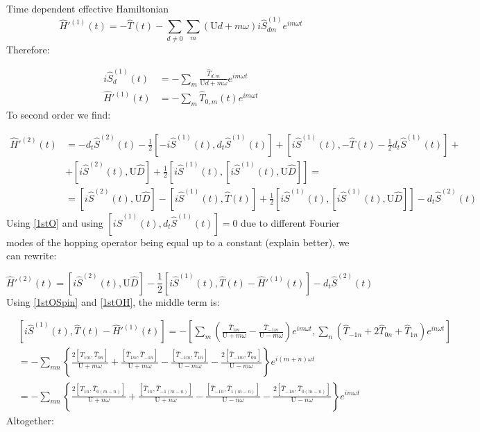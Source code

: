 \begin{section}{Time dependent effective Hamiltonian}
\begin{equation}
\hat{H}'^{(1)}(t)=-\hat{T}(t)-\sum_{d\neq 0}\sum_m (\text{U}d+m\omega) i\hat{S}^{(1)}_{dm} e^{im\omega t}
\end{equation}
Therefore:

\begin{align}
i\hat{S}^{(1)}_d(t) &= -\sum_m \frac{\hat{T}_{d,m}}{\text{U}d+m\omega}e^{im\omega t} \label{1stOSpin}\\
\hat{H}'^{(1)}(t) &= -\sum_m \hat{T}_{0,m}(t)e^{im\omega t} \label{1stOH}
\end{align}
To second order we find:

\begin{align}
\hat{H}'^{(2)}(t) &= - d_t\hat{S}^{(2)}(t) - \frac{1}{2}\left[-i\hat{S}^{(1)}(t), d_t\hat{S}^{(1)}(t) \right] + \left[i\hat{S}^{(1)}(t), -\hat{T}(t)-\frac{1}{2}d_t\hat{S}^{(1)}(t) \right] +\nonumber \\
&+ \left[i\hat{S}^{(2)}(t), \text{U}\hat{D} \right] + \frac{1}{2} \left[i\hat{S}^{(1)}(t), \left[i\hat{S}^{(1)}(t), \text{U}\hat{D} \right] \right] = \nonumber \\
&= \left[i\hat{S}^{(2)}(t), \text{U} \hat{D} \right] - \left[ i\hat{S}^{(1)}(t), \hat{T}(t) \right] + \frac{1}{2}\left[ i\hat{S}^{(1)}(t), \left[ i\hat{S}^{(1)}(t), \text{U}\hat{D} \right] \right] - d_t\hat{S}^{(2)}(t)
\end{align}
Using \ref{1stO} and using $\left[ i\hat{S}^{(1)}(t), d_t\hat{S}^{(1)}(t)\right] = 0$ due to different Fourier modes of the hopping operator being equal up to a constant (explain better), we can rewrite:

\begin{equation}
\hat{H}'^{(2)}(t) = \left[i\hat{S}^{(2)}(t), \text{U} \hat{D} \right] - \frac{1}{2}\left[ i\hat{S}^{(1)}(t), \hat{T}(t) - \hat{H}'^{(1)}(t)\right] - d_t\hat{S}^{(2)}(t)
\end{equation}
Using \ref{1stOSpin} and \ref{1stOH}, the middle term is:

\begin{align*}
&\left[ i\hat{S}^{(1)}(t), \hat{T}(t) - \hat{H}'^{(1)}(t)\right] = -\left[\sum_m \left( \frac{\hat{T}_{1m}}{\text{U}+m\omega} - \frac{\hat{T}_{-1m}}{\text{U}-m\omega} \right)e^{im \omega t}, \sum_n \left( \hat{T}_{-1n} + 2\hat{T}_{0n} + \hat{T}_{1n} \right) e^{in\omega t} \right] \\
&= -\sum_{mn} \left\{ \frac{2\left[\hat{T}_{1m}, \hat{T}_{0n} \right]}{\text{U}+m\omega} + \frac{\left[\hat{T}_{1m}, \hat{T}_{-1n} \right]}{\text{U}+m\omega} - \frac{\left[\hat{T}_{-1m}, \hat{T}_{1n} \right]}{\text{U}-m\omega} - \frac{2\left[\hat{T}_{-1m}, \hat{T}_{0n} \right]}{\text{U}-m\omega} \right\} e^{i(m+n)\omega t} \\
&= -\sum_{mn} \left\{ \frac{2\left[\hat{T}_{1n}, \hat{T}_{0(m-n)} \right]}{\text{U}+n\omega} + \frac{\left[\hat{T}_{1n}, \hat{T}_{-1(m-n)} \right]}{\text{U}+n\omega} - \frac{\left[\hat{T}_{-1n}, \hat{T}_{1(m-n)} \right]}{\text{U}-n\omega} - \frac{2\left[\hat{T}_{-1n}, \hat{T}_{0(m-n)} \right]}{\text{U}-n\omega} \right\} e^{im\omega t}
\end{align*}
Altogether:


\end{section}
